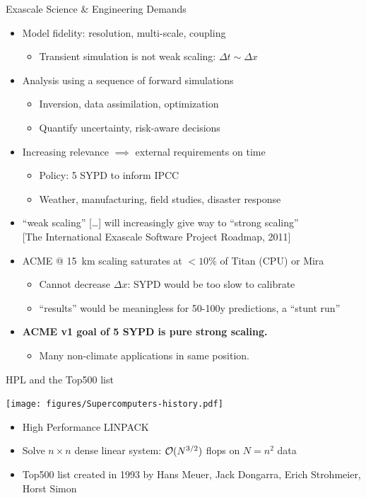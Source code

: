 \documentclass{beamer}
\begin{document}
\begin{frame}{Exascale Science \& Engineering Demands}
  \begin{itemize}
  \item Model fidelity: resolution, multi-scale, coupling
    \begin{itemize}
    \item Transient simulation is not weak scaling: $\Delta t \sim \Delta x$
    \end{itemize}
  \item Analysis using a sequence of forward simulations
    \begin{itemize}
    \item Inversion, data assimilation, optimization
    \item Quantify uncertainty, risk-aware decisions
    \end{itemize}
  \item Increasing relevance $\implies$ external requirements on time
    \begin{itemize}
    \item Policy: 5 SYPD to inform IPCC
    \item Weather, manufacturing, field studies, disaster response
    \end{itemize}
  \item ``weak scaling'' [\ldots] will increasingly give way to ``strong scaling''\\
    {\scriptsize [The International Exascale Software Project Roadmap, 2011]}
  \item ACME @ \SI{15}{\kilo\metre} scaling saturates at $<10\%$ of Titan (CPU) or Mira
    \begin{itemize}
    \item Cannot decrease $\Delta x$: SYPD would be too slow to calibrate
    \item ``results'' would be meaningless for 50-100y predictions, a ``stunt run''
    \end{itemize}
  \item \alert{\bf ACME v1 goal of 5 SYPD is pure strong scaling.}
    \begin{itemize}
    \item Many non-climate applications in same position.
    \end{itemize}
  \end{itemize}
\end{frame}

\begin{frame}{HPL and the Top500 list}
  \begin{center}
    \texttt{[image: figures/Supercomputers-history.pdf]}
  \end{center}
  \begin{itemize}
  \item High Performance LINPACK
  \item Solve $n\times n$ dense linear system: $\mathcal{O}(N^{3/2})$ flops on $N=n^2$ data
  \item Top500 list created in 1993 by Hans Meuer, Jack Dongarra, Erich
    Strohmeier, Horst Simon
  \end{itemize}
\end{frame}
\end{document}
